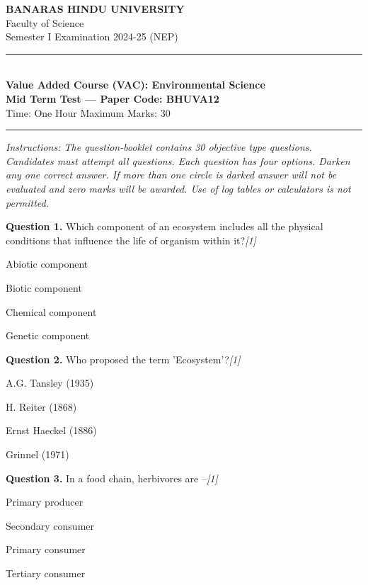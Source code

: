 \documentclass[11pt,a4paper]{article}
\newcommand{\pts}[1]{\hfill \textit{[#1]}}
\begin{document}
\begin{center}
  {\large\bfseries BANARAS HINDU UNIVERSITY}\\[2pt]
  {\normalsize Faculty of Science}\\[2pt]
  {\normalsize Semester I Examination 2024-25 (NEP)}\\[6pt]
  \rule{0.8\linewidth}{0.5pt}\\[6pt]
  {\large\bfseries Value Added Course (VAC): Environmental Science}\\[4pt]
  {\large\bfseries Mid Term Test --- Paper Code: BHUVA12}\\[4pt]
  {\normalsize Time: One Hour \hfill Maximum Marks: 30}
\end{center}

\rule{\linewidth}{0.4pt}

\smallskip

\noindent \textit{Instructions: The question-booklet contains 30 objective type questions. Candidates must attempt all questions. Each question has four options. Darken any one correct answer. If more than one circle is darked answer will not be evaluated and zero marks will be awarded. Use of log tables or calculators is not permitted.}

\bigskip

\noindent \textbf{Question 1.} Which component of an ecosystem includes all the physical conditions that influence the life of organism within it?\pts{1}
\begin{parts}
  \item Abiotic component
  \item Biotic component
  \item Chemical component
  \item Genetic component
\end{parts}

\medskip

\noindent \textbf{Question 2.} Who proposed the term 'Ecosystem'?\pts{1}
\begin{parts}
  \item A.G. Tansley (1935)
  \item H. Reiter (1868)
  \item Ernst Haeckel (1886)
  \item Grinnel (1971)
\end{parts}

\medskip

\noindent \textbf{Question 3.} In a food chain, herbivores are --\pts{1}
\begin{parts}
  \item Primary producer
  \item Secondary consumer
  \item Primary consumer
  \item Tertiary consumer
\end{parts}
\end{document}
